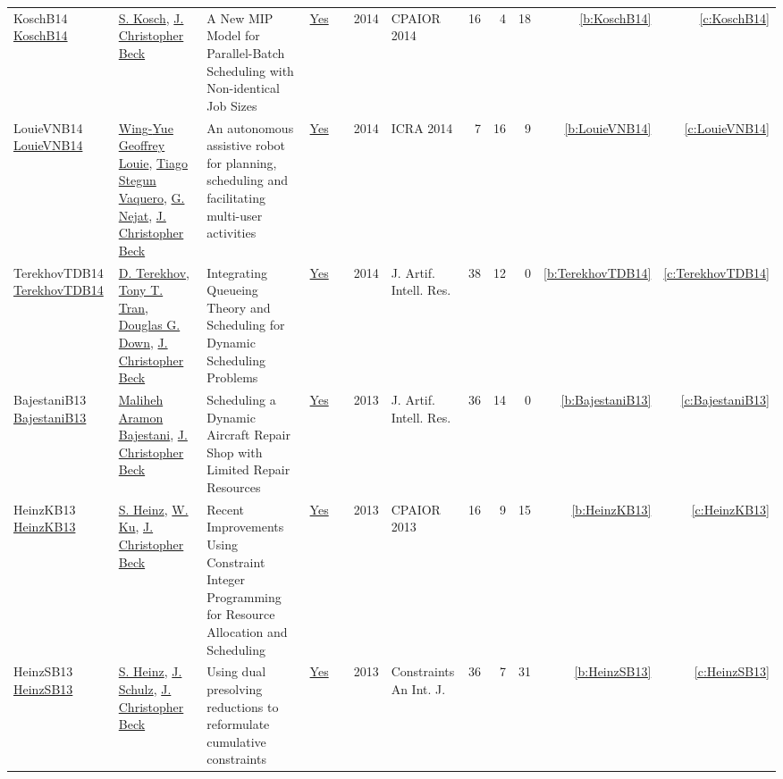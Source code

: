 {\begin{longtable}{>{\raggedright\arraybackslash}p{3cm}>{\raggedright\arraybackslash}p{6cm}>{\raggedright\arraybackslash}p{6.5cm}rrrp{2.5cm}rrrrr}
KoschB14 \href{https://doi.org/10.1007/978-3-319-07046-9\_5}{KoschB14} & \hyperref[auth:a333]{S. Kosch}, \hyperref[auth:a89]{J. Christopher Beck} & A New {MIP} Model for Parallel-Batch Scheduling with Non-identical Job Sizes & \href{../works/KoschB14.pdf}{Yes} & \cite{KoschB14} & 2014 & CPAIOR 2014 & 16 & 4 & 18 & \ref{b:KoschB14} & \ref{c:KoschB14}\\
LouieVNB14 \href{https://doi.org/10.1109/ICRA.2014.6907637}{LouieVNB14} & \hyperref[auth:a831]{Wing{-}Yue Geoffrey Louie}, \hyperref[auth:a816]{Tiago Stegun Vaquero}, \hyperref[auth:a210]{G. Nejat}, \hyperref[auth:a89]{J. Christopher Beck} & An autonomous assistive robot for planning, scheduling and facilitating multi-user activities & \href{../works/LouieVNB14.pdf}{Yes} & \cite{LouieVNB14} & 2014 & ICRA 2014 & 7 & 16 & 9 & \ref{b:LouieVNB14} & \ref{c:LouieVNB14}\\
TerekhovTDB14 \href{https://doi.org/10.1613/jair.4278}{TerekhovTDB14} & \hyperref[auth:a830]{D. Terekhov}, \hyperref[auth:a811]{Tony T. Tran}, \hyperref[auth:a815]{Douglas G. Down}, \hyperref[auth:a89]{J. Christopher Beck} & Integrating Queueing Theory and Scheduling for Dynamic Scheduling Problems & \href{../works/TerekhovTDB14.pdf}{Yes} & \cite{TerekhovTDB14} & 2014 & J. Artif. Intell. Res. & 38 & 12 & 0 & \ref{b:TerekhovTDB14} & \ref{c:TerekhovTDB14}\\
BajestaniB13 \href{https://doi.org/10.1613/jair.3902}{BajestaniB13} & \hyperref[auth:a829]{Maliheh Aramon Bajestani}, \hyperref[auth:a89]{J. Christopher Beck} & Scheduling a Dynamic Aircraft Repair Shop with Limited Repair Resources & \href{../works/BajestaniB13.pdf}{Yes} & \cite{BajestaniB13} & 2013 & J. Artif. Intell. Res. & 36 & 14 & 0 & \ref{b:BajestaniB13} & \ref{c:BajestaniB13}\\
HeinzKB13 \href{https://doi.org/10.1007/978-3-642-38171-3\_2}{HeinzKB13} & \hyperref[auth:a134]{S. Heinz}, \hyperref[auth:a337]{W. Ku}, \hyperref[auth:a89]{J. Christopher Beck} & Recent Improvements Using Constraint Integer Programming for Resource Allocation and Scheduling & \href{../works/HeinzKB13.pdf}{Yes} & \cite{HeinzKB13} & 2013 & CPAIOR 2013 & 16 & 9 & 15 & \ref{b:HeinzKB13} & \ref{c:HeinzKB13}\\
HeinzSB13 \href{https://doi.org/10.1007/s10601-012-9136-9}{HeinzSB13} & \hyperref[auth:a134]{S. Heinz}, \hyperref[auth:a135]{J. Schulz}, \hyperref[auth:a89]{J. Christopher Beck} & Using dual presolving reductions to reformulate cumulative constraints & \href{../works/HeinzSB13.pdf}{Yes} & \cite{HeinzSB13} & 2013 & Constraints An Int. J. & 36 & 7 & 31 & \ref{b:HeinzSB13} & \ref{c:HeinzSB13}\\

\end{longtable}}
